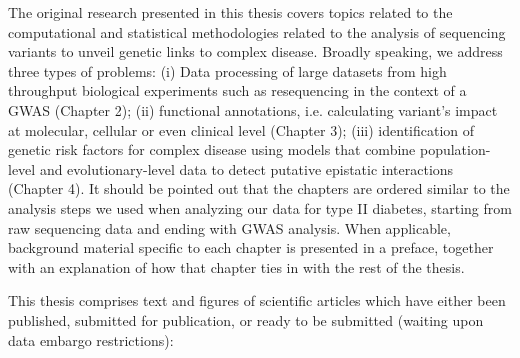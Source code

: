 The original research presented in this thesis covers topics related to the computational and statistical methodologies related to the analysis of sequencing variants to unveil genetic links to complex disease. Broadly speaking, we address three types of problems: (i) Data processing of large datasets from high throughput biological experiments such as resequencing in the context of a GWAS (Chapter 2); (ii) functional annotations, i.e. calculating variant’s impact at molecular, cellular or even clinical level (Chapter 3); (iii) identification of genetic risk factors for complex disease using models that combine population-level and evolutionary-level data to detect putative epistatic interactions (Chapter 4). It should be pointed out that the chapters are ordered similar to the analysis steps we used when analyzing our data for type II diabetes, starting from raw sequencing data and ending with GWAS analysis. When applicable, background material specific to each chapter is presented in a preface, together with an explanation of how that chapter ties in with the rest of the thesis.

This thesis comprises text and figures of scientific articles which have either been published, submitted for publication, or ready to be submitted (waiting upon data embargo restrictions):

